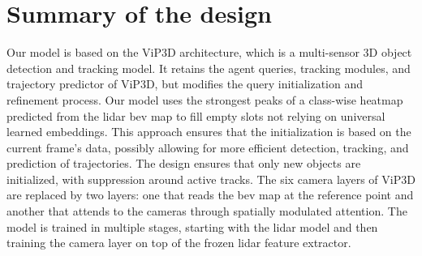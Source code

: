 \section{Summary of the design}
\label{sec:design-summary}

Our model is based on the ViP3D architecture, which is a multi-sensor 3D object detection and tracking model.
It retains the agent queries, tracking modules, and trajectory predictor of ViP3D, but modifies the query initialization and refinement process.
Our model uses the strongest peaks of a class-wise heatmap predicted from the \ac{lidar} \ac{bev} map to fill empty slots not relying on universal learned embeddings. 
This approach ensures that the initialization is based on the current frame's data, possibly allowing for more efficient detection, tracking, and prediction of trajectories.
The design ensures that only new objects are initialized, with suppression around active tracks. The six camera layers of ViP3D are replaced by two layers:
one that reads the \ac{bev} map at the reference point and another that attends to the cameras through spatially modulated attention. 
The model is trained in multiple stages, starting with the \ac{lidar} model and then training the camera layer on top of the frozen \ac{lidar} feature extractor.
